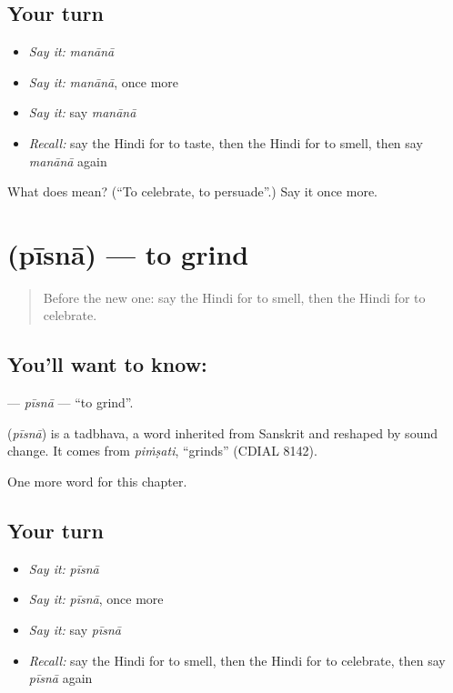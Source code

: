 \subsection*{Your turn}
\begin{itemize}
\raggedright
  \item \emph{Say it:} \emph{manānā}
  \item \emph{Say it:} \emph{manānā}, once more
  \item \emph{Say it:} say \emph{manānā}
  \item \emph{Recall:} say the Hindi for to taste, then the Hindi for to smell, then say \emph{manānā} again
\end{itemize}

\begin{tcolorbox}[breakable,colback=teal!4,colframe=teal!35!black,title={Before you move on}]
What does  mean? (\textquotedblleft{}To celebrate, to persuade\textquotedblright{}.) Say it once more.
\end{tcolorbox}
\section[\texorpdfstring{\hi{पीसना} (pīsnā)}{पीसना (pīsnā)}]{ (pīsnā) — to grind}

\label{lesson:HI-C177-pisna}



\begin{quote}
Before the new one: say the Hindi for to smell, then the Hindi for to celebrate.
\end{quote}

\subsection*{You'll want to know: }
\textbf{} — \emph{pīsnā} — \textquotedblleft{}to grind\textquotedblright{}.

\begin{cousinweb}
\textbf{} (\emph{pīsnā}) is a tadbhava, a word inherited from Sanskrit and reshaped by sound change. It comes from \emph{piṁṣati}, \textquotedblleft{}grinds\textquotedblright{} (CDIAL 8142).
\end{cousinweb}

\begin{grammarlens}[title={What you've built}]
One more word for this chapter.
\end{grammarlens}

\subsection*{Your turn}
\begin{itemize}
\raggedright
  \item \emph{Say it:} \emph{pīsnā}
  \item \emph{Say it:} \emph{pīsnā}, once more
  \item \emph{Say it:} say \emph{pīsnā}
  \item \emph{Recall:} say the Hindi for to smell, then the Hindi for to celebrate, then say \emph{pīsnā} again
\end{itemize}


